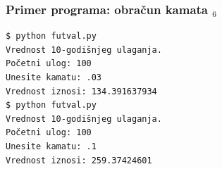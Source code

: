 \documentclass[utf8,compress]{beamer}
\begin{document}
\begin{frame}[fragile]
  \frametitle{Primer programa: obračun kamata $_6$}
\begin{verbatim}
$ python futval.py
Vrednost 10-godišnjeg ulaganja.
Početni ulog: 100
Unesite kamatu: .03
Vrednost iznosi: 134.391637934
$ python futval.py
Vrednost 10-godišnjeg ulaganja.
Početni ulog: 100
Unesite kamatu: .1
Vrednost iznosi: 259.37424601
\end{verbatim}
\end{frame}
\end{document}
